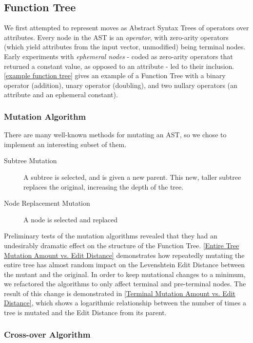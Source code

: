 \documentclass{acm_proc_article-sp}
\begin{document}
\subsection{Function Tree}

We first attempted to represent moves as Abstract Syntax Trees of operators over attributes. Every node in the AST is an \textit{operator}, with zero-arity operators (which yield attributes from the input vector, unmodified) being terminal nodes. Early experiments with \textit{ephemeral nodes} - coded as zero-arity operators that returned a constant value, as opposed to an attribute - led to their inclusion. \ref{example function tree} gives an example of a Function Tree with a binary operator (addition), unary operator (doubling), and two nullary operators (an attribute and an ephemeral constant).

\subsubsection{Mutation Algorithm}

There are many well-known methods for mutating an AST, so we chose to implement an interesting subset of them. 
\begin{description}
    \item[Subtree Mutation] A subtree is selected, and is given a new parent. This new, taller subtree replaces the original, increasing the depth of the tree.\cite{genetic_programming}
    \item[Node Replacement Mutation] A node is selected and replaced
\end{description}
    Preliminary tests of the mutation algorithms revealed that they had an undesirably dramatic effect on the structure of the Function Tree. \ref{Entire Tree Mutation Amount vs. Edit Distance} demonstrates how repeatedly mutating the entire tree has almost random impact on the Levenshtein Edit Distance between the mutant and the original. In order to keep mutational changes to a minimum, we refactored the algorithms to only affect terminal and pre-terminal nodes. The result of this change is demonstrated in \ref{Terminal Mutation Amount vs. Edit Distance}, which shows a logarithmic relationship between the number of times a tree is mutated and the Edit Distance from its parent.
    
    \subsubsection{Cross-over Algorithm}
    
\end{document}
